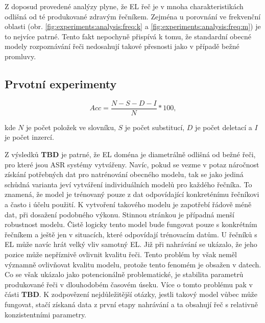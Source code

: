 Z doposud provedené analýzy plyne, že EL řeč je v mnoha charakteristikách odlišná od té produkované zdravým řečníkem. Zejména u porovnání ve frekvenční oblasti (obr. \ref{fig:experiments:analysis:freq:k} a \ref{fig:experiments:analysis:freq:m}) je to nejvíce patrné. Tento fakt nepochyně přispívá k tomu, že standardní obecné modely rozpoznávání řeči nedosahují takové přesnosti jako v případě bežné promluvy.


\subsection{Prvotní experimenty}
\label{chap:experiments:analysis:experiment}

\begin{equation}
  Acc = \frac{N - S - D - I}{N} * 100
  \label{eq:experiments:analysis:experiment:accuracy},
\end{equation}

\noindent kde $N$ je počet položek ve slovníku, $S$ je počet substitucí, $D$ je počet deletací a $I$ je počet inzercí.

Z výsledků \textbf{TBD} je patrné, že EL doména je diametrálně odlišná od bežné řeči, pro které jsou ASR systémy vytvářeny. Navíc, pokud se vezme v potaz náročnost získání potřebných dat pro natrénování obecného modelu, tak se jako jediná schůdná varianta jeví vytváření individuálních modelů pro každého řečníka. To znamená, že model je trénovaný pouze z dat odpovídající konkreténímu řečníkovi a často i účelu použití. K vytvoření takového modelu je zapotřebí řádově méně dat, při dosažení podobného výkonu. Stinnou stránkou je případná menší robustnost modelu. Čistě logicky tento model bude fungovat pouze s konkrétním řečníkem a ještě jen v situacích, které odpovídají trénovacím datům. U řečníků s EL může navíc hrát velký vliv samotný EL. Již při nahrávání se ukázalo, že jeho pozice může nepříznivě ovlivnit kvalitu řeči. Tento problém by však neměl významně ovlivňovat kvalitu modelu, protože tento fenomém je obsažen v datech. Co se však ukázalo jako potencionálně problematické, je stabilita parametrů produkované řeči v dlouhodobém časovém úseku. Více o tomto problému pak v části \textbf{TBD}. K zodpovězení nejdůležitější otázky, jestli takový model vůbec může fungovat, stačí získaná data z první etapy nahrávání a ta obsahují řeč s relativně konzistentními parametry.

